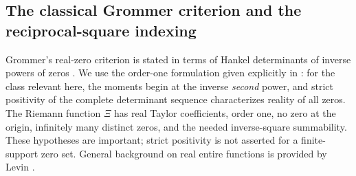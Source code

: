 \documentclass[11pt,letterpaper]{article}
\numberwithin{equation}{section}
\theoremstyle{definition}
\theoremstyle{remark}
\begin{document}
\subsection{The classical Grommer criterion and the reciprocal-square indexing}
\label{subsec:grommernormalization}
Grommer's real-zero criterion is stated in terms of Hankel determinants of inverse powers of zeros \cite{grommer}. We use the order-one formulation given explicitly in \cite[Theorem~10]{bariczstampach}: for the class relevant here, the moments begin at the inverse \emph{second} power, and strict positivity of the complete determinant sequence characterizes reality of all zeros. The Riemann function $\Xi$ has real Taylor coefficients, order one, no zero at the origin, infinitely many distinct zeros, and the needed inverse-square summability. These hypotheses are important; strict positivity is not asserted for a finite-support zero set. General background on real entire functions is provided by Levin \cite{levin}.
\end{document}
